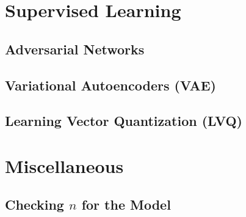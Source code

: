 \section{Supervised Learning}
\label{additional:supervised}

\subsection{Adversarial Networks} %
\label{additional:supervised:AN}

\subsection{Variational Autoencoders (VAE)}
\label{additional:supervised:VAE}

\subsection{Learning Vector Quantization (LVQ)}
\label{additional:supervised:kNN:LVQ}

\section{Miscellaneous}
\label{additional:misc}

\subsection{Checking \texorpdfstring{$n$}{N} for the Model}
\label{additional:misc:enough_data}

